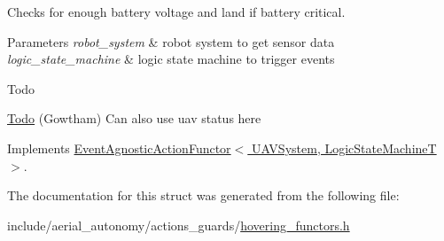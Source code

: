 Checks for enough battery voltage and land if battery critical. 


\begin{DoxyParams}{Parameters}
{\em robot\-\_\-system} & robot system to get sensor data \\
\hline
{\em logic\-\_\-state\-\_\-machine} & logic state machine to trigger events \\
\hline
\end{DoxyParams}
\begin{DoxyRefDesc}{Todo}
\item[\hyperlink{todo__todo000005}{Todo}](Gowtham) Can also use uav status here \end{DoxyRefDesc}


Implements \hyperlink{structEventAgnosticActionFunctor_a53a48938d68370ff2ef262222565ffcf}{Event\-Agnostic\-Action\-Functor$<$ U\-A\-V\-System, Logic\-State\-Machine\-T $>$}.



The documentation for this struct was generated from the following file\-:\begin{DoxyCompactItemize}
\item 
include/aerial\-\_\-autonomy/actions\-\_\-guards/\hyperlink{hovering__functors_8h}{hovering\-\_\-functors.\-h}\end{DoxyCompactItemize}
